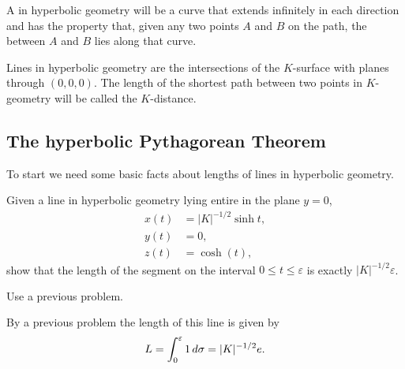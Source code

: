 \documentclass[handout,newpage,hints,,12pt,noauthor,nooutcomes]{ximera}
\begin{document}
\begin{definition}
A  in hyperbolic geometry will be a curve that extends
infinitely in each direction and has the property that, given any two
points $A$ and $B$ on the path, the  between $A$
and $B$ lies along that curve.



Lines in hyperbolic geometry are the intersections of the $K$-surface
with planes through $(0,0,0)$. The length of the shortest path between
two points in $K$-geometry will be called the $K$-distance.
\end{definition}


\subsection{The hyperbolic Pythagorean Theorem}

To start we need some basic facts about lengths of lines in hyperbolic
geometry.

\begin{problem}
  Given a line in hyperbolic geometry lying entire in the plane
  $y=0$,
  \begin{align*}
    x(t) &= |K|^{-1/2}\sinh t,\\
    y(t) &= 0,\\
    z(t) &= \cosh(t),
  \end{align*}
  show that the length of the segment on the interval $0 \leq t \leq
  \varepsilon$ is exactly $|K|^{-1/2}\varepsilon$.
  \begin{hint}
    Use a previous problem.
  \end{hint}
  \begin{freeResponse}
    By a previous problem the length of this line is given by
    \[
    L=\int_{0}^{\varepsilon} 1 \,d\sigma = |K|^{-1/2}e.
    \]
  \end{freeResponse}
\end{problem}
\end{document}
